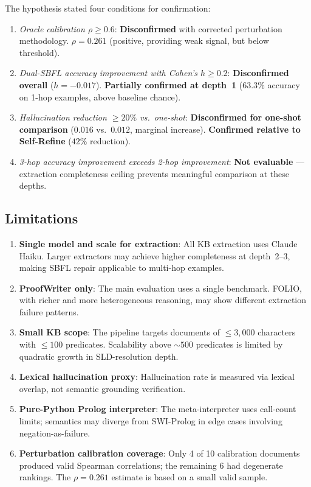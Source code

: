 \documentclass[11pt,letterpaper]{article}
\begin{document}
The hypothesis stated four conditions for confirmation:
\begin{enumerate}
  \item \emph{Oracle calibration $\rho \geq 0.6$}: \textbf{Disconfirmed} with corrected perturbation methodology. $\rho = 0.261$ (positive, providing weak signal, but below threshold).
  \item \emph{Dual-SBFL accuracy improvement with Cohen's $h \geq 0.2$}: \textbf{Disconfirmed overall} ($h = -0.017$). \textbf{Partially confirmed at depth~1} ($63.3\%$ accuracy on 1-hop examples, above baseline chance).
  \item \emph{Hallucination reduction $\geq 20\%$ vs.\ one-shot}: \textbf{Disconfirmed for one-shot comparison} ($0.016$ vs.\ $0.012$, marginal increase). \textbf{Confirmed relative to Self-Refine} ($42\%$ reduction).
  \item \emph{3-hop accuracy improvement exceeds 2-hop improvement}: \textbf{Not evaluable} — extraction completeness ceiling prevents meaningful comparison at these depths.
\end{enumerate}

\subsection{Limitations}

\begin{enumerate}
  \item \textbf{Single model and scale for extraction}: All KB extraction uses Claude Haiku. Larger extractors may achieve higher completeness at depth~2--3, making SBFL repair applicable to multi-hop examples.
  \item \textbf{ProofWriter only}: The main evaluation uses a single benchmark. FOLIO, with richer and more heterogeneous reasoning, may show different extraction failure patterns.
  \item \textbf{Small KB scope}: The pipeline targets documents of $\leq 3,000$ characters with $\leq 100$ predicates. Scalability above $\sim 500$ predicates is limited by quadratic growth in SLD-resolution depth.
  \item \textbf{Lexical hallucination proxy}: Hallucination rate is measured via lexical overlap, not semantic grounding verification.
  \item \textbf{Pure-Python Prolog interpreter}: The meta-interpreter uses call-count limits; semantics may diverge from SWI-Prolog in edge cases involving negation-as-failure.
  \item \textbf{Perturbation calibration coverage}: Only 4 of 10 calibration documents produced valid Spearman correlations; the remaining 6 had degenerate rankings. The $\rho = 0.261$ estimate is based on a small valid sample.
\end{enumerate}
\end{document}
